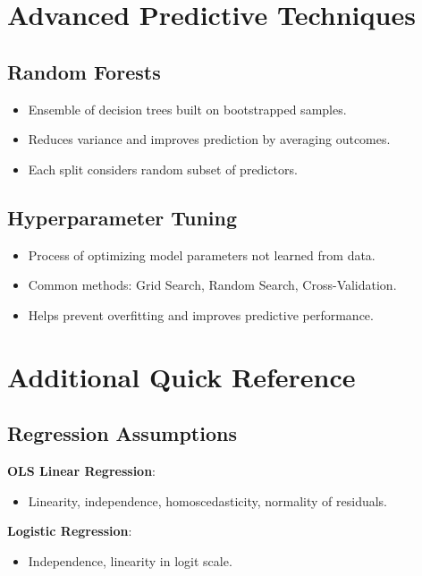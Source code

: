 \documentclass[10pt, landscape]{article}
\begin{document}
\begin{multicols}{3}
\section{Advanced Predictive Techniques}

\subsection{Random Forests}
\begin{itemize}[noitemsep]
    \item Ensemble of decision trees built on bootstrapped samples.
    \item Reduces variance and improves prediction by averaging outcomes.
    \item Each split considers random subset of predictors.
\end{itemize}

\subsection{Hyperparameter Tuning}
\begin{itemize}[noitemsep]
    \item Process of optimizing model parameters not learned from data.
    \item Common methods: Grid Search, Random Search, Cross-Validation.
    \item Helps prevent overfitting and improves predictive performance.
\end{itemize}

\section{Additional Quick Reference}

\subsection{Regression Assumptions}
\textbf{OLS Linear Regression}:
\begin{itemize}[noitemsep]
    \item Linearity, independence, homoscedasticity, normality of residuals.
\end{itemize}

\textbf{Logistic Regression}:
\begin{itemize}[noitemsep]
    \item Independence, linearity in logit scale.
\end{itemize}


\end{multicols}
\end{document}

